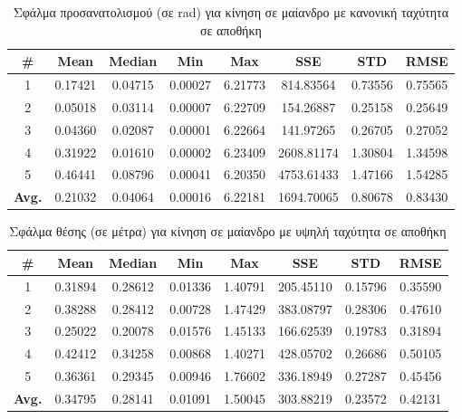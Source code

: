 \begin{table}[H]
    \centering
    \caption{Σφάλμα προσανατολισμού (σε rad) για κίνηση σε μαίανδρο με κανονική ταχύτητα σε αποθήκη}
    \label{tab:orientation_error_meander_normal_warehouse}
    \begin{tabular}{| c | c | c | c | c | c | c | c | }
        \hline
        \rowcolor{Gray}
        \# & Mean & Median & Min & Max & SSE & STD & RMSE \\
        \hline
        1 & 0.17421 & 0.04715 & 0.00027 & 6.21773 & 814.83564 & 0.73556 & 0.75565 \\
        2 & 0.05018 & 0.03114 & 0.00007 & 6.22709 & 154.26887 & 0.25158 & 0.25649 \\
        3 & 0.04360 & 0.02087 & 0.00001 & 6.22664 & 141.97265 & 0.26705 & 0.27052 \\
        4 & 0.31922 & 0.01610 & 0.00002 & 6.23409 & 2608.81174 & 1.30804 & 1.34598 \\
        5 & 0.46441 & 0.08796 & 0.00041 & 6.20350 & 4753.61433 & 1.47166 & 1.54285 \\
        \hline
        \textbf{Avg.} & 0.21032 & 0.04064 & 0.00016 & 6.22181 & 1694.70065 & 0.80678 & 0.83430 \\
        \hline
    \end{tabular}
\end{table}

\begin{table}[H]
    \begin{center}
        \centering
        \caption{Σφάλμα θέσης (σε μέτρα) για κίνηση σε μαίανδρο με υψηλή ταχύτητα σε αποθήκη}
            \label{tab:position_error_meander_fast_warehouse}
        \begin{tabular}{| c | c | c | c | c | c | c | c | }
        \hline
        \rowcolor{Gray}
        \# & Mean & Median & Min & Max & SSE & STD & RMSE \\
        \hline
        1 & 0.31894 & 0.28612 & 0.01336 & 1.40791 & 205.45110 & 0.15796 & 0.35590 \\
        2 & 0.38288 & 0.28412 & 0.00728 & 1.47429 & 383.08797 & 0.28306 & 0.47610 \\
        3 & 0.25022 & 0.20078 & 0.01576 & 1.45133 & 166.62539 & 0.19783 & 0.31894 \\
        4 & 0.42412 & 0.34258 & 0.00868 & 1.40271 & 428.05702 & 0.26686 & 0.50105 \\
        5 & 0.36361 & 0.29345 & 0.00946 & 1.76602 & 336.18949 & 0.27287 & 0.45456 \\
        \hline
        \textbf{Avg.} & 0.34795 & 0.28141 & 0.01091 & 1.50045 & 303.88219 & 0.23572 & 0.42131 \\
        \hline
        \end{tabular}
    \end{center}
\end{table}


